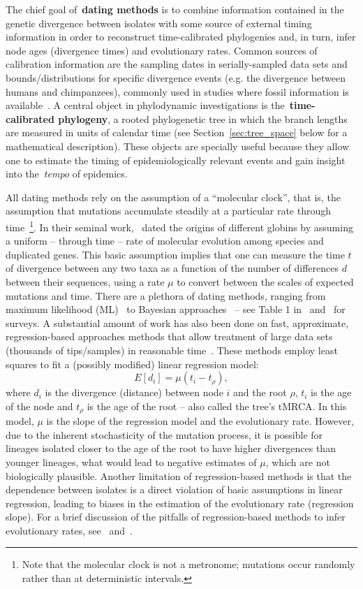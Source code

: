 The chief goal of~\textbf{dating methods} is to combine information contained in the genetic divergence between isolates with some source of external timing information in order to reconstruct time-calibrated phylogenies and, in turn, infer node ages (divergence times) and evolutionary rates.
Common sources of calibration information are the sampling dates in serially-sampled data sets and bounds/distributions for specific divergence events (e.g. the divergence between humans and chimpanzees), commonly used in studies where fossil information is available~\citep{Ho2009}.
A central object in phylodynamic investigations is the~\textbf{time-calibrated phylogeny}, a rooted phylogenetic tree in which the branch lengths are measured in units of calendar time (see Section~\ref{sec:tree_space} below for a mathematical description).
These objects are specially useful because they allow one to estimate the timing of epidemiologically relevant events and gain insight into the~\textit{tempo} of epidemics.

All dating methods rely on the assumption of a ``molecular clock'', that is, the assumption that mutations accumulate steadily at a particular rate through time~\citep{Welch2005}\footnote{Note that the molecular clock is not a metronome; mutations occur randomly rather than at deterministic intervals.}.
In their seminal work,~\cite{Zuckerkandl1962} dated the origins of different globins by assuming a uniform -- through time -- rate of molecular evolution among species and duplicated genes.
This basic assumption implies that one can measure the time $t$ of divergence between any two taxa as a function of the number of differences $d$ between their sequences, using a rate $\mu$ to convert between the scales of expected mutations and time.
There are a plethora of dating methods, ranging from maximum likelihood (ML)~\citep{Rambaut2000,Volz2017,Sagulenko2018} to Bayesian approaches~\citep{Drummond2006} -- see Table 1 in~\cite{Welch2005} and~\cite{Ho2014} for surveys.
A substantial amount of work has also been done on fast, approximate, regression-based approaches methods that allow treatment of large data sets (thousands of tips/samples) in reasonable time~\citep{To2015,Rambaut2016}.
These methods employ least squares to fit  a (possibly modified) linear regression model: 
\[ E[d_{i}] = \mu \left(t_i-t_\rho\right) ,\]
where $d_i$ is the divergence (distance) between node $i$ and the root $\rho$, $t_i$ is the age of the node and $t_\rho$ is the age of the root -- also called the tree's tMRCA.
In this model, $\mu$ is the slope of the regression model and the evolutionary rate. 
However, due to the inherent stochasticity  of the mutation process, it is possible for lineages isolated closer to the age of the root to have higher divergences than younger lineages, what would lead to negative estimates of $\mu$, which are not biologically plausible. 
Another limitation of regression-based methods is that the dependence between isolates is a direct violation of basic assumptions in linear regression, leading to biases in the estimation of the evolutionary rate (regression slope).
For a brief discussion of the pitfalls of regression-based methods to infer evolutionary rates, see~\cite{To2015} and~\cite{Rambaut2016}.

